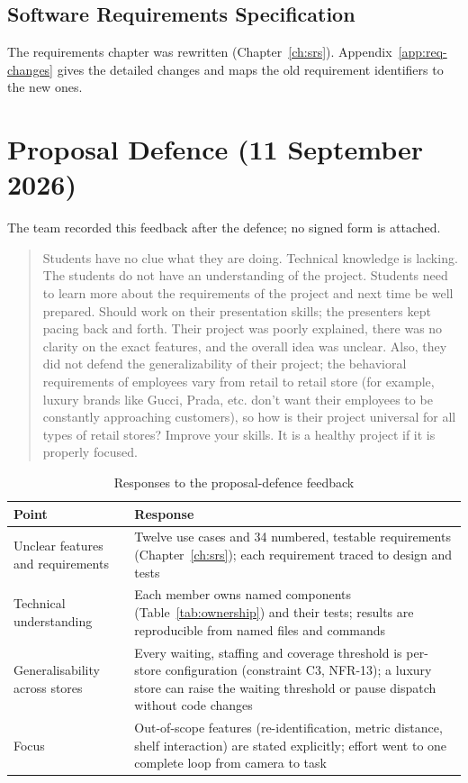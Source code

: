 \subsection{Software Requirements Specification}
The requirements chapter was rewritten (Chapter~\ref{ch:srs}). Appendix~\ref{app:req-changes} gives the detailed changes and maps the old requirement identifiers to the new ones.

\section{Proposal Defence (11 September 2026)}
The team recorded this feedback after the defence; no signed form is attached.
\begin{quote}
Students have no clue what they are doing. Technical knowledge is lacking. The students do not have an understanding of the project. Students need to learn more about the requirements of the project and next time be well prepared. Should work on their presentation skills; the presenters kept pacing back and forth. Their project was poorly explained, there was no clarity on the exact features, and the overall idea was unclear. Also, they did not defend the generalizability of their project; the behavioral requirements of employees vary from retail to retail store (for example, luxury brands like Gucci, Prada, etc. don't want their employees to be constantly approaching customers), so how is their project universal for all types of retail stores? Improve your skills. It is a healthy project if it is properly focused.
\end{quote}

\begin{table}[H]
\centering
\caption{Responses to the proposal-defence feedback}\label{tab:defence-response}
\begin{tabular}{P{0.3\textwidth}P{0.62\textwidth}}
\toprule
Point & Response\\
\midrule
Unclear features and requirements & Twelve use cases and 34 numbered, testable requirements (Chapter~\ref{ch:srs}); each requirement traced to design and tests\\
Technical understanding & Each member owns named components (Table~\ref{tab:ownership}) and their tests; results are reproducible from named files and commands\\
Generalisability across stores & Every waiting, staffing and coverage threshold is per-store configuration (constraint C3, NFR-13); a luxury store can raise the waiting threshold or pause dispatch without code changes\\
Focus & Out-of-scope features (re-identification, metric distance, shelf interaction) are stated explicitly; effort went to one complete loop from camera to task\\
\bottomrule
\end{tabular}
\end{table}
